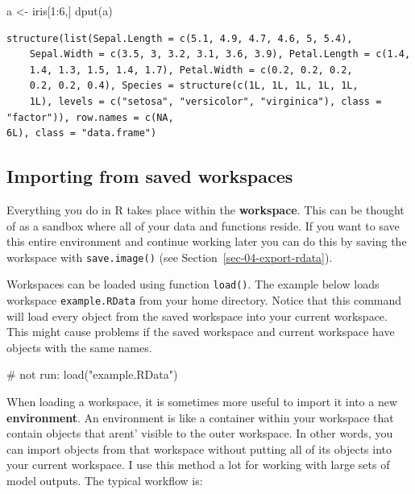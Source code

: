 \documentclass[
  13,
  letterpaper,
]{report}
\newenvironment{Shaded}{\begin{snugshade}}{\end{snugshade}}
\newcommand{\CommentTok}[1]{\textcolor[rgb]{0.37,0.37,0.37}{#1}}
\newcommand{\DecValTok}[1]{\textcolor[rgb]{0.68,0.00,0.00}{#1}}
\newcommand{\FunctionTok}[1]{\textcolor[rgb]{0.28,0.35,0.67}{#1}}
\newcommand{\NormalTok}[1]{\textcolor[rgb]{0.00,0.23,0.31}{#1}}
\newcommand{\OtherTok}[1]{\textcolor[rgb]{0.00,0.23,0.31}{#1}}
\newcommand{\SpecialCharTok}[1]{\textcolor[rgb]{0.37,0.37,0.37}{#1}}
\newcommand{\StringTok}[1]{\textcolor[rgb]{0.13,0.47,0.30}{#1}}
\begin{document}
\begin{Shaded}
\begin{Highlighting}[]
\NormalTok{a }\OtherTok{\textless{}{-}}\NormalTok{ iris[}\DecValTok{1}\SpecialCharTok{:}\DecValTok{6}\NormalTok{,]}
\FunctionTok{dput}\NormalTok{(a)}
\end{Highlighting}
\end{Shaded}

\begin{verbatim}
structure(list(Sepal.Length = c(5.1, 4.9, 4.7, 4.6, 5, 5.4), 
    Sepal.Width = c(3.5, 3, 3.2, 3.1, 3.6, 3.9), Petal.Length = c(1.4, 
    1.4, 1.3, 1.5, 1.4, 1.7), Petal.Width = c(0.2, 0.2, 0.2, 
    0.2, 0.2, 0.4), Species = structure(c(1L, 1L, 1L, 1L, 1L, 
    1L), levels = c("setosa", "versicolor", "virginica"), class = "factor")), row.names = c(NA, 
6L), class = "data.frame")
\end{verbatim}

\subsection{Importing from saved workspaces}\label{sec-04-import-rdata}

Everything you do in R takes place within the \textbf{workspace}. This
can be thought of as a sandbox where all of your data and functions
reside. If you want to save this entire environment and continue working
later you can do this by saving the workspace with \texttt{save.image()}
(see Section~\ref{sec-04-export-rdata}).

Workspaces can be loaded using function \texttt{load()}. The example
below loads workspace \texttt{example.RData} from your home directory.
Notice that this command will load every object from the saved workspace
into your current workspace. This might cause problems if the saved
workspace and current workspace have objects with the same names.

\begin{Shaded}
\begin{Highlighting}[]
\CommentTok{\# not run:}
\FunctionTok{load}\NormalTok{(}\StringTok{"example.RData"}\NormalTok{)}
\end{Highlighting}
\end{Shaded}

When loading a workspace, it is sometimes more useful to import it into
a new \textbf{environment}. An environment is like a container within
your workspace that contain objects that arent' visible to the outer
workspace. In other words, you can import objects from that workspace
without putting all of its objects into your current workspace. I use
this method a lot for working with large sets of model outputs. The
typical workflow is:
\end{document}
